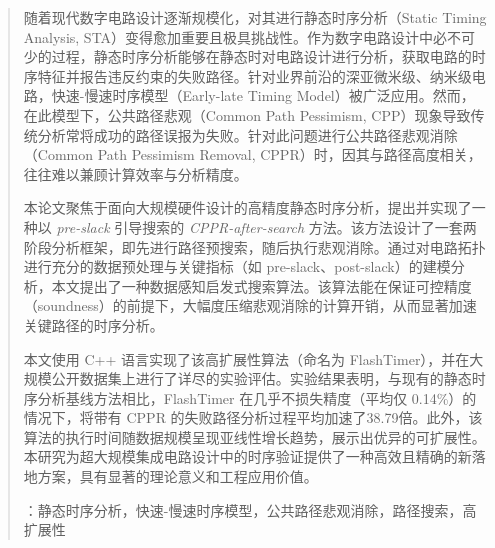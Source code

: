 \begin{abstract}
随着现代数字电路设计逐渐规模化，对其进行静态时序分析（Static Timing Analysis, STA）变得愈加重要且极具挑战性。作为数字电路设计中必不可少的过程，静态时序分析能够在静态时对电路设计进行分析，获取电路的时序特征并报告违反约束的失败路径。针对业界前沿的深亚微米级、纳米级电路，快速-慢速时序模型（Early-late Timing Model）被广泛应用。然而，在此模型下，公共路径悲观（Common Path Pessimism, CPP）现象导致传统分析常将成功的路径误报为失败。针对此问题进行公共路径悲观消除（Common Path Pessimism Removal, CPPR）时，因其与路径高度相关，往往难以兼顾计算效率与分析精度。

本论文聚焦于面向大规模硬件设计的高精度静态时序分析，提出并实现了一种以 \textit{pre-slack} 引导搜索的 \textit{CPPR-after-search} 方法。该方法设计了一套两阶段分析框架，即先进行路径预搜索，随后执行悲观消除。通过对电路拓扑进行充分的数据预处理与关键指标（如 pre-slack、post-slack）的建模分析，本文提出了一种数据感知启发式搜索算法。该算法能在保证可控精度（soundness）的前提下，大幅度压缩悲观消除的计算开销，从而显著加速关键路径的时序分析。

本文使用 C++ 语言实现了该高扩展性算法（命名为 FlashTimer），并在大规模公开数据集上进行了详尽的实验评估。实验结果表明，与现有的静态时序分析基线方法相比，FlashTimer 在几乎不损失精度（平均仅 0.14\%）的情况下，将带有 CPPR 的失败路径分析过程平均加速了38.79倍。此外，该算法的执行时间随数据规模呈现亚线性增长趋势，展示出优异的可扩展性。本研究为超大规模集成电路设计中的时序验证提供了一种高效且精确的新落地方案，具有显著的理论意义和工程应用价值。

\vskip 12bp
：静态时序分析，快速-慢速时序模型，公共路径悲观消除，路径搜索，高扩展性
\end{abstract}

